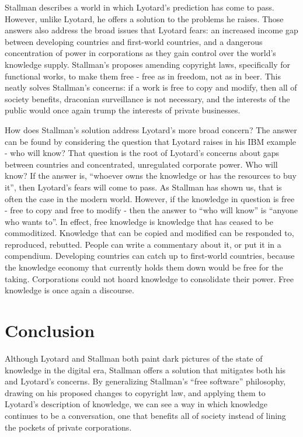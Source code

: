 \documentclass[titlepage]{article}
\begin{document}
Stallman describes a world in which Lyotard's prediction has come to
pass. However, unlike Lyotard, he offers a solution to the problems he
raises. Those answers also address the broad issues that Lyotard fears:
an increased income gap between developing countries and first-world
countries, and a dangerous concentration of power in corporations as
they gain control over the world's knowledge supply. Stallman's proposes
amending copyright laws, specifically for functional works, to make them
free - free as in freedom, not as in beer. This neatly solves Stallman's
concerns: if a work is free to copy and modify, then all of society
benefits, draconian surveillance is not necessary, and the interests of
the public would once again trump the interests of private businesses.

How does Stallman's solution address Lyotard's more broad concern? The
answer can be found by considering the question that Lyotard raises in
his IBM example - who will know? That question is the root of Lyotard's
concerns about gaps between countries and concentrated, unregulated
corporate power. Who will know? If the answer is, ``whoever owns the
knowledge or has the resources to buy it'', then Lyotard's fears will
come to pass. As Stallman has shown us, that is often the case in the
modern world. However, if the knowledge in question is free - free to
copy and free to modify - then the answer to ``who will know'' is
``anyone who wants to''. In effect, free knowledge is knowledge that has
ceased to be commoditized. Knowledge that can be copied and modified can
be responded to, reproduced, rebutted. People can write a commentary
about it, or put it in a compendium. Developing countries can catch up
to first-world countries, because the knowledge economy that currently
holds them down would be free for the taking. Corporations could not
hoard knowledge to consolidate their power. Free knowledge is once again
a discourse.

\section{Conclusion}\label{conclusion}

Although Lyotard and Stallman both paint dark pictures of the state of
knowledge in the digital era, Stallman offers a solution that mitigates
both his and Lyotard's concerns. By generalizing Stallman's ``free
software'' philosophy, drawing on his proposed changes to copyright law,
and applying them to Lyotard's description of knowledge, we can see a
way in which knowledge continues to be a conversation, one that benefits
all of society instead of lining the pockets of private corporations.
\end{document}
